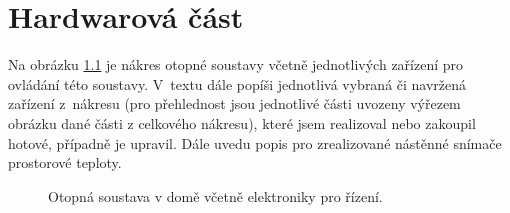 \chapter{Hardwarová část}

Na obrázku \ref{fig:otopna-soustava-a-elektronika-rez-domu} je nákres otopné soustavy včetně jednotlivých zařízení pro ovládání této soustavy. V~textu dále popíši jednotlivá vybraná či navržená zařízení z~nákresu (pro přehlednost jsou jednotlivé části uvozeny výřezem obrázku dané části z celkového nákresu), které jsem realizoval nebo zakoupil hotové, případně je upravil. Dále uvedu popis pro zrealizované nástěnné snímače prostorové teploty.

\newpage

\begin{figure}[H]
    \centering
    \def\svgwidth{\columnwidth}
    
    \caption{Otopná soustava v domě včetně elektroniky pro řízení.}
    \label{fig:otopna-soustava-a-elektronika-rez-domu}
\end{figure}


























